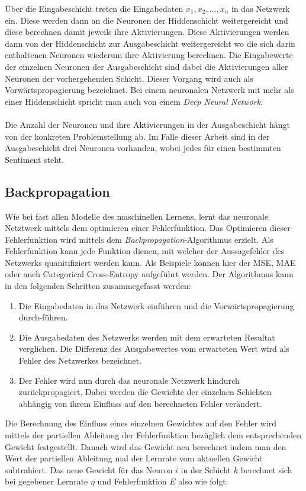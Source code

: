 Über die Eingabeschicht treten die Eingabedaten $x_1, x_2, ..., x_n$ in das Netzwerk ein. Diese werden dann an die Neuronen der Hiddenschicht weitergereicht und diese berechnen damit jeweils ihre Aktivierungen. Diese Aktivierungen werden dann von der Hiddenschicht zur Ausgabeschicht weitergereicht wo die sich darin enthaltenen Neuronen wiederum ihre Aktivierung berechnen. Die Eingabewerte der einzelnen Neuronen der Ausgabeschicht sind dabei die Aktivierungen aller Neuronen der vorhergehenden Schicht. Dieser Vorgang wird auch als Vorwärtspropagierung bezeichnet. Bei einem neuronalen Netzwerk mit mehr als einer Hiddenschicht spricht man auch von einem \emph{Deep Neural Network}.\\\\
Die Anzahl der Neuronen und ihre Aktivierungen in der Ausgabeschicht hängt von der konkreten Problemstellung ab. Im Falle dieser Arbeit sind in der Ausgabeschicht drei Neuronen vorhanden, wobei jedes für einen bestimmten Sentiment steht.

\subsection{Backpropagation}
Wie bei fast allen Modelle des maschinellen Lernens, lernt das neuronale Netztwerk mittels dem optimieren einer Fehlerfunktion. Das Optimieren dieser Fehlerfunktion wird mittels dem \emph{Backpropagation}-Algorithmus erzielt. Als Fehlerfunktion kann jede Funktion dienen, mit welcher der Aussagefehler des Netzwerks quanitifiziert werden kann. Als Beispiele können hier der MSE, MAE oder auch Categorical Cross-Entropy aufgeführt werden. Der Algorithmus kann in den folgenden Schritten zusammegefasst werden:
\begin{enumerate}
	\item Die Eingabedaten in das Netzwerk einführen und die Vorwärtspropagierung durch-führen.
	\item Die Ausgabedaten des Netzwerks werden mit dem erwarteten Resultat verglichen. Die Differenz des Ausgabewertes vom erwarteten Wert wird als Fehler des Netzwerkes bezeichnet.
	\item Der Fehler wird nun durch das neuronale Netzwerk hindurch zurückpropagiert. Dabei werden die Gewichte der einzelnen Schichten abhängig von ihrem Einfluss auf den berechneten Fehler verändert.
\end{enumerate}

Die Berechnung des Einfluss eines einzelnen Gewichtes auf den Fehler wird mittels der partiellen Ableitung der Fehlerfunktion bezüglich dem entsprechenden Gewicht festgestellt. Danach wird das Gewicht neu berechnet indem man den Wert der partiellen Ableitung mal der Lernrate vom aktuellen Gewicht subtrahiert. Das neue Gewicht für das Neuron $i$ in der Schicht $k$ berechnet sich bei gegebener Lernrate $\eta$ und Fehlerfunktion $E$ also wie folgt:

